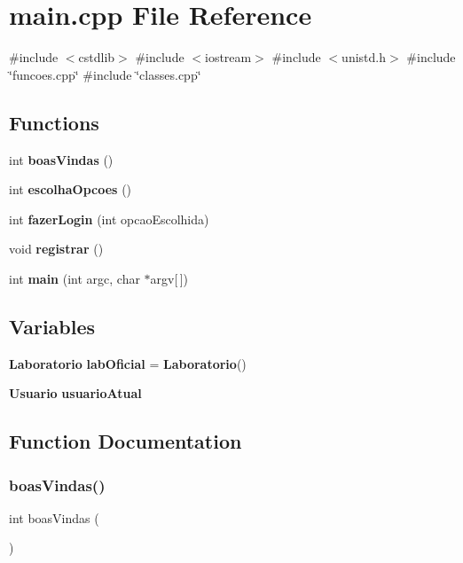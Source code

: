 \section{main.\+cpp File Reference}
\label{main_8cpp}
{\ttfamily \#include $<$cstdlib$>$}\newline
{\ttfamily \#include $<$iostream$>$}\newline
{\ttfamily \#include $<$unistd.\+h$>$}\newline
{\ttfamily \#include \char`\"{}funcoes.\+cpp\char`\"{}}\newline
{\ttfamily \#include \char`\"{}classes.\+cpp\char`\"{}}\newline
\subsection*{Functions}
\begin{DoxyCompactItemize}
\item 
int \textbf{ boas\+Vindas} ()
\item 
int \textbf{ escolha\+Opcoes} ()
\item 
int \textbf{ fazer\+Login} (int opcao\+Escolhida)
\item 
void \textbf{ registrar} ()
\item 
int \textbf{ main} (int argc, char $\ast$argv[$\,$])
\end{DoxyCompactItemize}
\subsection*{Variables}
\begin{DoxyCompactItemize}
\item 
\textbf{ Laboratorio} \textbf{ lab\+Oficial} = \textbf{ Laboratorio}()
\item 
\textbf{ Usuario} \textbf{ usuario\+Atual}
\end{DoxyCompactItemize}


\subsection{Function Documentation}
\mbox{\label{main_8cpp_a85d81fce7438473f2c655a988d7eaaae}} 
\subsubsection{boas\+Vindas()}
{\footnotesize\ttfamily int boas\+Vindas (\begin{DoxyParamCaption}{ }\end{DoxyParamCaption})}

